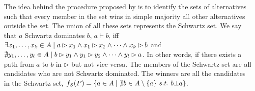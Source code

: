 \begin{indented}[Schwartz]
	The idea behind the procedure proposed by \citet{Schwartz1972} is to identify the sets of alternatives such that every member in the set wins in simple majority all other alternatives outside the set. The union of all these sets represents the Schwartz set.
	We say that $a$ Schwartz dominates $b$, $a \vdash b$, iff $\exists x_1, \dots, x_k \in A \suchthat a \rhd x_1 \land x_1 \rhd x_2 \land \dots \land x_k\rhd b$ and  $\nexists y_1, \dots, y_l \in A \suchthat b \rhd y_1 \land y_1 \rhd y_2 \land \dots \land y_l\rhd a$. In other words, if there exists a path from $a$ to $b$ in $\rhd$ but not vice-versa.
	The members of the Schwartz set are all candidates who are not Schwartz dominated.
	The winners are all the candidates in the Schwartz set, $f_{S}(P)=\{a\in A \suchthat  \nexists b \in A \setminus\{a\} \ s.t. \ b \bot a \}$.
	
\end{indented}


